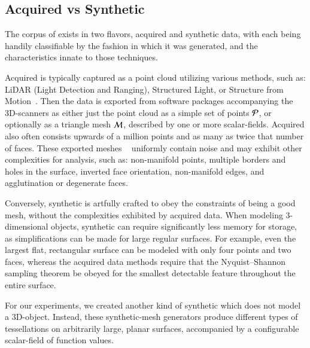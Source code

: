 
%
\subsection{Acquired vs Synthetic \tdd{}}
\label{ch2s3ssAVS3}
The corpus of \tdd{} exists in two flavors, acquired and synthetic data, with each being handily classifiable by the fashion in which it was generated, and the characteristics innate to those techniques.

Acquired \tdd{} is typically captured as a point cloud utilizing various methods, such as: LiDAR (Light Detection and Ranging), Structured Light, or Structure from Motion~\cite[p.~19]{Mara12}. Then the data is exported from software packages accompanying the 3D-scanners as either just the point cloud as a simple set of points $\mathcal{P}$, or optionally as a triangle mesh $\mathcal{M}$, described by one or more scalar-fields. Acquired \tdd{} also often consists upwards of a million points and as many as twice that number of faces. These exported meshes ~\cite[p.~25]{Mara12} uniformly contain noise and may exhibit other complexities for analysis, such as: non-manifold points, multiple borders and holes in the surface, inverted face orientation, non-manifold edges, and agglutination or degenerate faces. ~\cite[p.~28-32]{Mara12}

Conversely, synthetic \tdd{} is artfully crafted to obey the constraints of being a good mesh, without the complexities exhibited by acquired data. When modeling 3-dimensional objects, synthetic \tdd{} can require significantly less memory for storage, as simplifications can be made for large regular surfaces. For example, even the largest flat, rectangular surface can be modeled with only four points and two faces, whereas the acquired data methods require that the Nyquist–Shannon sampling theorem be obeyed for the smallest detectable feature throughout the entire surface.~\cite[p.~19]{Mara12}~\cite[p.~3]{Mara17}

For our experiments, we created another kind of synthetic \tdd{} which does not model a 3D-object. Instead, these synthetic-mesh generators produce different types of tessellations on arbitrarily large, planar surfaces, accompanied by a configurable scalar-field of function values.
%
